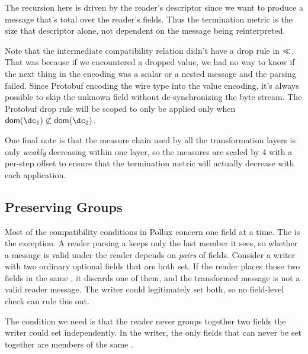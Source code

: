 The recursion here is driven by the reader's descriptor since we want to produce
a message that's total over the reader's fields. Thus the termination metric is
the size that descriptor alone, not dependent on the message being
reinterpreted.

Note that the intermediate compatibility relation didn't have a drop rule in
$\ll$. That was because if we encountered a dropped value, we had no way to know
if the next thing in the encoding was a scalar or a nested message and the
parsing failed. Since Protobuf encoding the wire type into the value encoding,
it's always possible to skip the unknown field without de-synchronizing the byte
stream. The Protobuf drop rule will be scoped to only be applied only when
$\dom{\dc_1} \not \subset \dom{\dc_2}$.

One final note is that the measure chain used by all the transformation layers
is only \emph{weakly} decreasing within one layer, so the measures are scaled by
4 with a per-step offset to ensure that the termination metric will actually
decrease with each application. 

\subsection{Preserving \Oneof{} Groups}\label{sec:oneof-pres}

Most of the compatibility conditions in Pollux concern one field at a time. The
\Oneof{} is the exception. A reader parsing a \Oneof{} keeps only the last
member it sees, so whether a message is valid under the reader depends on
\emph{pairs} of fields. Consider a writer with two ordinary optional fields that
are both set. If the reader places those two fields in the same \Oneof{}, it
discards one of them, and the transformed message is not a valid reader message.
The writer could legitimately set both, so no field-level check can rule this
out.

The condition we need is that the reader never groups together two fields the
writer could set independently. In the writer, the only fields that can never be
set together are members of the same \Oneof{}.


